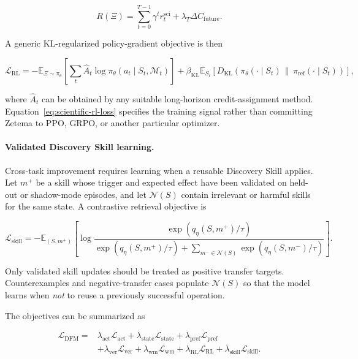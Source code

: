 \documentclass[11pt, a4paper, copyright]{google}
\begin{document}
\begin{equation}
R(\Xi)
=
\sum_{t=0}^{T-1}\gamma^t r_t^{\mathrm{sci}}
+
\lambda_T\Delta C_{\mathrm{future}}.
\label{eq:scientific-trajectory-return}
\end{equation}

A generic KL-regularized policy-gradient objective is then

\begin{equation}
\mathcal{L}_{\mathrm{RL}}
=
-\mathbb{E}_{\Xi\sim\pi_{\theta}}
\left[
\sum_t \widehat{A}_t
\log\pi_{\theta}(a_t\mid S_t,\mathcal{M}_t)
\right]
+
\beta_{\mathrm{KL}}
\mathbb{E}_{S_t}
\left[
D_{\mathrm{KL}}
\left(
\pi_{\theta}(\cdot\mid S_t)
\,\|\,
\pi_{\mathrm{ref}}(\cdot\mid S_t)
\right)
\right],
\label{eq:scientific-rl-loss}
\end{equation}

where $\widehat{A}_t$ can be obtained by any suitable long-horizon credit-assignment method. Equation~\ref{eq:scientific-rl-loss} specifies the training signal rather than committing Zetema to PPO, GRPO, or another particular optimizer.

\paragraph{Validated Discovery Skill learning.}
Cross-task improvement requires learning when a reusable Discovery Skill applies. Let $m^{+}$ be a skill whose trigger and expected effect have been validated on held-out or shadow-mode episodes, and let $\mathcal{N}(S)$ contain irrelevant or harmful skills for the same state. A contrastive retrieval objective is

\begin{equation}
\mathcal{L}_{\mathrm{skill}}
=
-\mathbb{E}_{(S,m^{+})}
\left[
\log
\frac{
\exp(q_{\eta}(S,m^{+})/\tau)
}{
\exp(q_{\eta}(S,m^{+})/\tau)
+
\sum_{m^{-}\in\mathcal{N}(S)}
\exp(q_{\eta}(S,m^{-})/\tau)
}
\right].
\label{eq:discovery-skill-loss}
\end{equation}

Only validated skill updates should be treated as positive transfer targets. Counterexamples and negative-transfer cases populate $\mathcal{N}(S)$ so that the model learns when \emph{not} to reuse a previously successful operation.

The objectives can be summarized as

\begin{equation}
\begin{aligned}
\mathcal{L}_{\mathrm{DFM}}
={}&
\lambda_{\mathrm{act}}\mathcal{L}_{\mathrm{act}}
+\lambda_{\mathrm{state}}\mathcal{L}_{\mathrm{state}}
+\lambda_{\mathrm{pref}}\mathcal{L}_{\mathrm{pref}}
\\
&+\lambda_{\mathrm{ver}}\mathcal{L}_{\mathrm{ver}}
+\lambda_{\mathrm{wm}}\mathcal{L}_{\mathrm{wm}}
+\lambda_{\mathrm{RL}}\mathcal{L}_{\mathrm{RL}}
+\lambda_{\mathrm{skill}}\mathcal{L}_{\mathrm{skill}}.
\end{aligned}
\label{eq:dfm-training-objective}
\end{equation}
\end{document}
